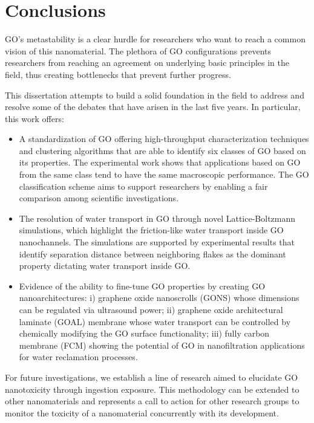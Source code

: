 \chapter{Conclusions}
\dsp
\justifying
GO's metastability is a clear hurdle for researchers who want to reach a common vision of this nanomaterial. The plethora of GO configurations prevents researchers from reaching an agreement on underlying basic principles in the field, thus creating bottlenecks that prevent further progress.

This dissertation attempts to build a solid foundation in the field to address and resolve some of the debates that have arisen in the last five years. In particular, this work offers:
\begin{itemize}
\item A standardization of GO offering high-throughput characterization techniques and clustering algorithms that are able to identify six classes of GO based on its properties. The experimental work shows that applications based on GO from the same class tend to have the same macroscopic performance. The GO classification scheme aims to support researchers by enabling a fair comparison among scientific investigations.
\item The resolution of water transport in GO through novel Lattice-Boltzmann simulations, which highlight the friction-like water transport inside GO nanochannels. The simulations are supported by experimental results that identify separation distance between neighboring flakes as the dominant property dictating water transport inside GO.
\item Evidence of the ability to fine-tune GO properties by creating GO nanoarchitectures: i) graphene oxide nanoscrolls (GONS) whose dimensions can be regulated via ultrasound power; ii) graphene oxide architectural laminate (GOAL) membrane whose water transport can be controlled by chemically modifying the GO surface functionality; iii) fully carbon membrane (FCM) showing the potential of GO in nanofiltration applications for water reclamation processes.
\end{itemize}

For future investigations, we establish a line of research aimed to elucidate GO nanotoxicity through ingestion exposure. This methodology can be extended to other nanomaterials and represents a call to action for other research groups to monitor the toxicity of a nanomaterial concurrently with its development.
